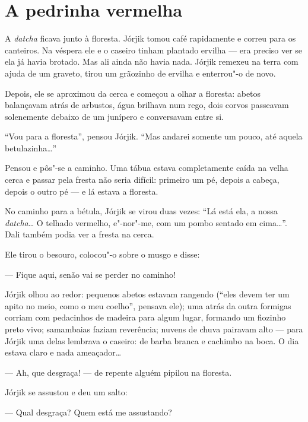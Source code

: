 \chapter{A pedrinha vermelha} \label{part14}

A \emph{datcha} ficava junto à floresta. Jórjik tomou café rapidamente e
correu para os canteiros. Na véspera ele e o caseiro tinham plantado
ervilha --- era preciso ver se ela já havia brotado. Mas ali ainda não
havia nada. Jórjik remexeu na terra com ajuda de um graveto, tirou um
grãozinho de ervilha e enterrou"-o de novo.

Depois, ele se aproximou da cerca e começou a olhar a floresta: abetos
balançavam atrás de arbustos, água brilhava num rego, dois corvos
passeavam solenemente debaixo de um junípero e conversavam entre si.

``Vou para a floresta'', pensou Jórjik. ``Mas andarei somente um pouco,
até aquela betulazinha\ldots{}''

Pensou e pôs"-se a caminho. Uma tábua estava completamente caída na velha
cerca e passar pela fresta não seria difícil: primeiro um pé, depois a
cabeça, depois o outro pé --- e lá estava a floresta.

No caminho para a bétula, Jórjik se virou duas vezes: ``Lá está ela, a
nossa \emph{datcha}\ldots{} O telhado vermelho, e"-nor"-me, com um pombo
sentado em cima\ldots{}''. Dali também podia ver a fresta na cerca.


Ele tirou o besouro, colocou"-o sobre o musgo e disse:

--- Fique aqui, senão vai se perder no caminho!

Jórjik olhou ao redor: pequenos abetos estavam rangendo (``eles devem
ter um apito no meio, como o meu coelho'', pensava ele); uma atrás da
outra formigas corriam com pedacinhos de madeira para algum lugar, formando um fiozinho preto vivo; samambaias faziam reverência; nuvens
de chuva pairavam alto --- para Jórjik uma delas lembrava o caseiro: de
barba branca e cachimbo na boca. O dia estava claro e nada ameaçador\ldots{}

--- Ah, que desgraça! --- de repente alguém pipilou na floresta.

Jórjik se assustou e deu um salto:

--- Qual desgraça? Quem está me assustando?

